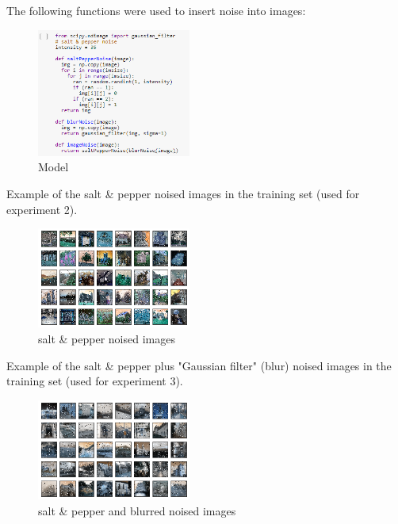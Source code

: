 \documentclass[twocolumn,showpacs,%
  nofootinbib,aps,superscriptaddress,%
  eqsecnum,prd,notitlepage,showkeys,10pt]{revtex4-1}
\begin{document}
The following functions were used to insert noise into images:
\begin{figure}[H]
\includegraphics[width=0.45\textwidth]{images/noise.PNG}
\caption{\label{fig:noise}Model}
\end{figure}
Example of the salt \& pepper noised images in the training set (used for experiment 2).
\begin{figure}[H]
    \includegraphics[width=0.45\textwidth]{images/64x64.png}
    \caption{\label{fig:noise} salt \& pepper noised images}
\end{figure}
Example of the salt \& pepper plus "Gaussian filter" (blur) noised images in the training set (used for experiment 3).
\begin{figure}[H]
    \includegraphics[width=0.45\textwidth]{images/64_full_noise.png}
    \caption{\label{fig:noise} salt \& pepper and blurred noised images}
\end{figure}
\end{document}
